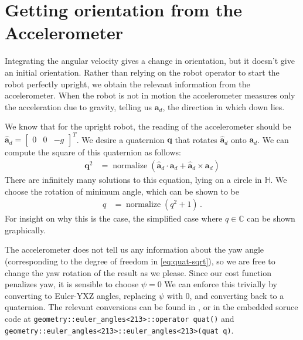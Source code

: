 \documentclass[main.tex]{subfiles}
\begin{document}
\section{Getting orientation from the Accelerometer}

	Integrating the angular velocity gives a change in orientation, but it doesn't give an initial orientation.
	Rather than relying on the robot operator to start the robot perfectly upright, we obtain the relevant information from the accelerometer. When the robot is not in motion the accelerometer measures only the acceleration due to gravity, telling us $\bm{a}_d$, the direction in which down lies.

	We know that for the upright robot, the reading of the accelerometer should be $\hat{\bm{a}}_d = \begin{bmatrix}0 & 0 & -g\end{bmatrix}^T$\footnotemark. We desire a quaternion $\bm{q}$ that rotates $\hat{\bm{a}}_d$ onto $\bm{a}_d$. We can compute the square of this quaternion as follows:
	\begin{align}
		\bm{q}^2
			&= \operatorname{normalize}\left(
				\hat{\bm{a}}_d \cdot \bm{a}_d + \hat{\bm{a}}_d \times \bm{a}_d
			\right)
			\label{eq:quat-sqrt}
	\end{align}
	There are infinitely many solutions to this equation, lying on a circle in $\mathbb{H}$.
	We choose the rotation of minimum angle, which can be shown to be
	\begin{align}
		q &= \operatorname{normalize}(q^2 + 1)\,.
	\end{align}
	For insight on why this is the case, the simplified case where $q\in\mathbb{C}$ can be shown graphically.

	The accelerometer does not tell us any information about the yaw angle (corresponding to the degree of freedom in \cref{eq:quat-sqrt}), so we are free to change the yaw rotation of the result as we please.
	Since our cost function penalizes yaw, it is sensible to choose $\psi = 0$
	 We can enforce this trivially by converting to Euler-YXZ angles, replacing $\psi$ with $0$, and converting back to a quaternion\footnotemark. The relevant conversions can be found in \cite[eq~362 and 369]{diebel2006representing}, or in the embedded soruce code at \lstinline{geometry::euler_angles<213>::operator quat()} and \lstinline{geometry::euler_angles<213>::euler_angles<213>(quat q)}.


\bib
\end{document}
